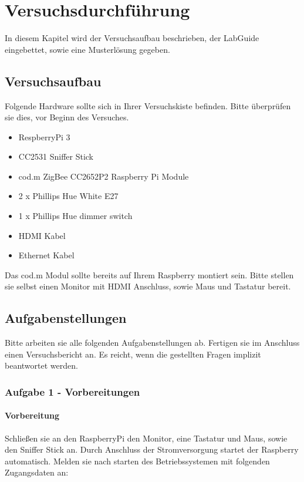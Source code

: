 \chapter{Versuchsdurchführung}

In diesem Kapitel wird der Versuchsaufbau beschrieben, der LabGuide eingebettet, sowie eine Musterlösung gegeben.

\section{Versuchsaufbau}

Folgende Hardware sollte sich in Ihrer Versuchskiste befinden. Bitte überprüfen sie dies, vor Beginn des Versuches.

\begin{itemize}
    \item RespberryPi 3
    \item CC2531 Sniffer Stick
    \item cod.m ZigBee CC2652P2 Raspberry Pi Module
    \item 2 x Phillips Hue White E27
    \item 1 x Phillips Hue dimmer switch
    \item HDMI Kabel
    \item Ethernet Kabel
\end{itemize}

Das cod.m Modul sollte bereits auf Ihrem Raspberry montiert sein. Bitte stellen sie selbst einen Monitor mit HDMI Anschluss, sowie Maus und Tastatur bereit.

\section{Aufgabenstellungen}

Bitte arbeiten sie alle folgenden Aufgabenstellungen ab. Fertigen sie im Anschluss einen Versuchsbericht an. Es reicht, wenn die gestellten Fragen
implizit beantwortet werden.

\subsection{Aufgabe 1 - Vorbereitungen}

\subsubsection{Vorbereitung}
Schließen sie an den RaspberryPi den Monitor, eine Tastatur und Maus, sowie den Sniffer Stick an. Durch Anschluss der
Stromversorgung startet der Raspberry automatisch. Melden sie nach starten des Betriebssystemen mit folgenden Zugangsdaten an:


